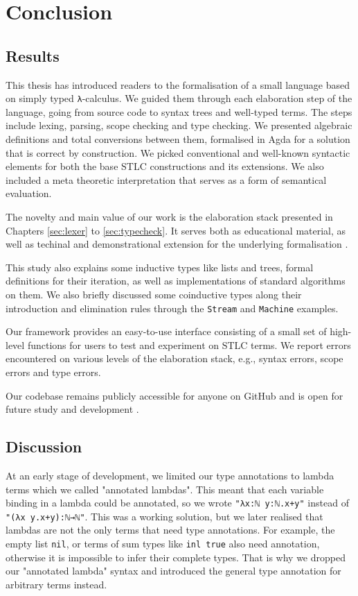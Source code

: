 \chapter{Conclusion}
\label{ch:conclusion}

\section{Results}

This thesis has introduced readers to the formalisation of a small language based on simply typed \verb$λ$-calculus. We guided them through each elaboration step of the language, going from source code to syntax trees and well-typed terms. The steps include lexing, parsing, scope checking and type checking. We presented algebraic definitions and total conversions between them, formalised in Agda for a solution that is correct by construction. We picked conventional and well-known syntactic elements for both the base STLC constructions and its extensions. We also included a meta theoretic interpretation that serves as a form of semantical evaluation.

The novelty and main value of our work is the elaboration stack presented in Chapters \ref{sec:lexer} to \ref{sec:typecheck}. It serves both as educational material, as well as techinal and demonstrational extension for the underlying formalisation \cite{typesystems-repo}.

This study also explains some inductive types like lists and trees, formal definitions for their iteration, as well as implementations of standard algorithms on them. We also briefly discussed some coinductive types along their introduction and elimination rules through the \verb$Stream$ and \verb$Machine$ examples.

Our framework provides an easy-to-use interface consisting of a small set of high-level functions for users to test and experiment on STLC terms. We report errors encountered on various levels of the elaboration stack, e.g., syntax errors, scope errors and type errors.

Our codebase remains publicly accessible for anyone on GitHub and is open for future study and development \cite{home-repo}.

\section{Discussion}

At an early stage of development, we limited our type annotations to lambda terms which we called "annotated lambdas". This meant that each variable binding in a lambda could be annotated, so we wrote \verb$"λx:ℕ y:ℕ.x+y"$ instead of \verb$"(λx y.x+y):ℕ→ℕ"$. This was a working solution, but we later realised that lambdas are not the only terms that need type annotations. For example, the empty list \verb$nil$, or terms of sum types like \verb$inl true$ also need annotation, otherwise it is impossible to infer their complete types. That is why we dropped our "annotated lambda" syntax and introduced the general type annotation for arbitrary terms instead.

